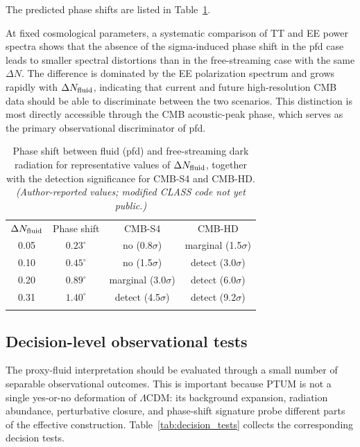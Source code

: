 \documentclass[epj]{svjour}
\begin{document}
The predicted phase shifts are listed in
Table~\ref{tab:phaseshift}.

At fixed cosmological parameters, a systematic comparison of TT
and EE power spectra shows that the absence of the sigma-induced
phase shift in the pfd case leads to smaller spectral distortions
than in the free-streaming case with the same \(\Delta N\). The
difference is dominated by the EE polarization spectrum and grows
rapidly with \(\Delta N_{\rm fluid}\), indicating that current and
future high-resolution CMB data should be able to discriminate
between the two scenarios. This distinction is most directly
accessible through the CMB acoustic-peak phase, which serves as
the primary observational discriminator of pfd.

\begin{table}
\caption{Phase shift between fluid (pfd) and free-streaming dark
radiation for representative values of \(\Delta N_{\rm fluid}\),
together with the detection significance for CMB-S4 and CMB-HD.
\emph{(Author-reported values; modified CLASS code not yet public.)}}
\label{tab:phaseshift}
\centering
\begin{tabular}{cccc}
\hline\noalign{\smallskip}
\(\Delta N_{\rm fluid}\) & Phase shift & CMB-S4 & CMB-HD \\
\noalign{\smallskip}\hline\noalign{\smallskip}
0.05 & \(0.23^\circ\) & no (0.8\(\sigma\)) & marginal (1.5\(\sigma\)) \\
0.10 & \(0.45^\circ\) & no (1.5\(\sigma\)) & detect (3.0\(\sigma\)) \\
0.20 & \(0.89^\circ\) & marginal (3.0\(\sigma\)) & detect (6.0\(\sigma\)) \\
0.31 & \(1.40^\circ\) & detect (4.5\(\sigma\)) & detect (9.2\(\sigma\)) \\
\noalign{\smallskip}\hline

\end{tabular}
\end{table}

\subsection{Decision-level observational tests}
\label{sec:decision_tests}

The proxy-fluid interpretation should be evaluated through a small number of
separable observational outcomes.  This is important because PTUM is not a
single yes-or-no deformation of \(\Lambda\)CDM: its background expansion,
radiation abundance, perturbative closure, and phase-shift signature probe
different parts of the effective construction.  Table~\ref{tab:decision_tests}
collects the corresponding decision tests.
\end{document}
